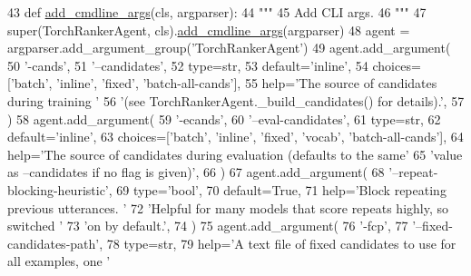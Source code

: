 \begin{DoxyCode}
43     \textcolor{keyword}{def }\hyperlink{namespaceparlai_1_1agents_1_1drqa_1_1config_a62fdd5554f1da6be0cba185271058320}{add\_cmdline\_args}(cls, argparser):
44         \textcolor{stringliteral}{"""}
45 \textcolor{stringliteral}{        Add CLI args.}
46 \textcolor{stringliteral}{        """}
47         super(TorchRankerAgent, cls).\hyperlink{namespaceparlai_1_1agents_1_1drqa_1_1config_a62fdd5554f1da6be0cba185271058320}{add\_cmdline\_args}(argparser)
48         agent = argparser.add\_argument\_group(\textcolor{stringliteral}{'TorchRankerAgent'})
49         agent.add\_argument(
50             \textcolor{stringliteral}{'-cands'},
51             \textcolor{stringliteral}{'--candidates'},
52             type=str,
53             default=\textcolor{stringliteral}{'inline'},
54             choices=[\textcolor{stringliteral}{'batch'}, \textcolor{stringliteral}{'inline'}, \textcolor{stringliteral}{'fixed'}, \textcolor{stringliteral}{'batch-all-cands'}],
55             help=\textcolor{stringliteral}{'The source of candidates during training '}
56             \textcolor{stringliteral}{'(see TorchRankerAgent.\_build\_candidates() for details).'},
57         )
58         agent.add\_argument(
59             \textcolor{stringliteral}{'-ecands'},
60             \textcolor{stringliteral}{'--eval-candidates'},
61             type=str,
62             default=\textcolor{stringliteral}{'inline'},
63             choices=[\textcolor{stringliteral}{'batch'}, \textcolor{stringliteral}{'inline'}, \textcolor{stringliteral}{'fixed'}, \textcolor{stringliteral}{'vocab'}, \textcolor{stringliteral}{'batch-all-cands'}],
64             help=\textcolor{stringliteral}{'The source of candidates during evaluation (defaults to the same'}
65             \textcolor{stringliteral}{'value as --candidates if no flag is given)'},
66         )
67         agent.add\_argument(
68             \textcolor{stringliteral}{'--repeat-blocking-heuristic'},
69             type=\textcolor{stringliteral}{'bool'},
70             default=\textcolor{keyword}{True},
71             help=\textcolor{stringliteral}{'Block repeating previous utterances. '}
72             \textcolor{stringliteral}{'Helpful for many models that score repeats highly, so switched '}
73             \textcolor{stringliteral}{'on by default.'},
74         )
75         agent.add\_argument(
76             \textcolor{stringliteral}{'-fcp'},
77             \textcolor{stringliteral}{'--fixed-candidates-path'},
78             type=str,
79             help=\textcolor{stringliteral}{'A text file of fixed candidates to use for all examples, one '}

\end{DoxyCode}
